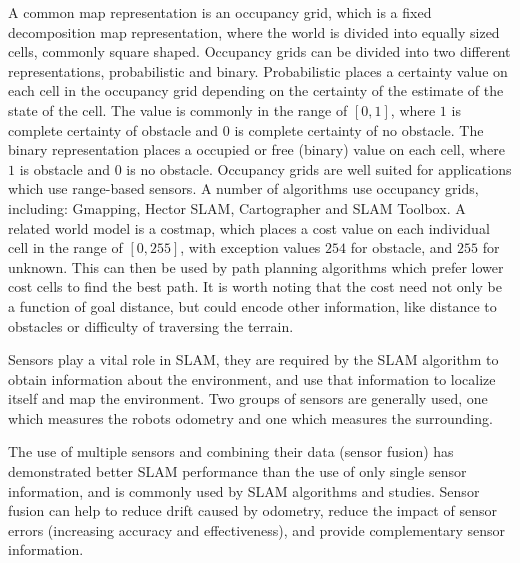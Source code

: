 A common map representation is an occupancy grid, which is a fixed decomposition map representation\:\cite{siegwart_introduction_2011}, where the world is divided into equally sized cells, commonly square shaped\:\cite{liu_path_2023}.  Occupancy grids can be divided into two different representations, probabilistic and binary\:\cite{andriawan_eka_wijaya_research_2019}\cite{corke_robotics_2023}. 
Probabilistic places a certainty value on each cell in the occupancy grid depending on the certainty of the estimate of the state of the cell\:\cite{andriawan_eka_wijaya_research_2019}\cite{corke_robotics_2023}. The value is commonly in the range of $[0,1]$, where $1$ is complete certainty of obstacle and $0$ is complete certainty of no obstacle\:\cite{andriawan_eka_wijaya_research_2019}\cite{corke_robotics_2023}. 
The binary representation places a occupied or free (binary) value on each cell, where $1$ is obstacle and $0$ is no obstacle\:\cite{andriawan_eka_wijaya_research_2019}\cite{corke_robotics_2023}.
Occupancy grids are well suited for applications which use range-based sensors\:\cite{siegwart_introduction_2011}.
A number of algorithms use occupancy grids, including: Gmapping, Hector SLAM, Cartographer and SLAM Toolbox\:\cite{mu_occupancy_2022}\cite{macenski_slam_2021}.
A related world model is a costmap, which places a cost value on each individual cell in the range of $[0,255]$, with exception values $254$ for obstacle, and $255$ for unknown\:\cite{macenski_desks_2023}. This can then be used by path planning algorithms which prefer lower cost cells to find the best path. It is worth noting that the cost need not only be a function of goal distance, but could encode other information\:\cite{macenski_desks_2023}, like distance to obstacles or difficulty of traversing the terrain.


Sensors play a vital role in SLAM, they are required by the SLAM algorithm to obtain information about the environment, and use that information to localize itself and map the environment\:\cite{khan_investigation_2022}.
Two groups of sensors are generally used, one which measures the robots odometry and one which measures the surrounding\:\cite{khan_investigation_2022}.

The use of multiple sensors and combining their data (sensor fusion) has demonstrated better SLAM performance than the use of only single sensor information\:\cite{cai_lidarinertial_2023}, and is commonly used by SLAM algorithms and studies\:\cite{khole_comprehensive_2023}\cite{filip_lidar_2023}. Sensor fusion can help to reduce drift caused by odometry, reduce the impact of sensor errors (increasing accuracy and effectiveness), and provide complementary sensor information\:\cite{liu_path_2023}\cite{filip_lidar_2023}. 


